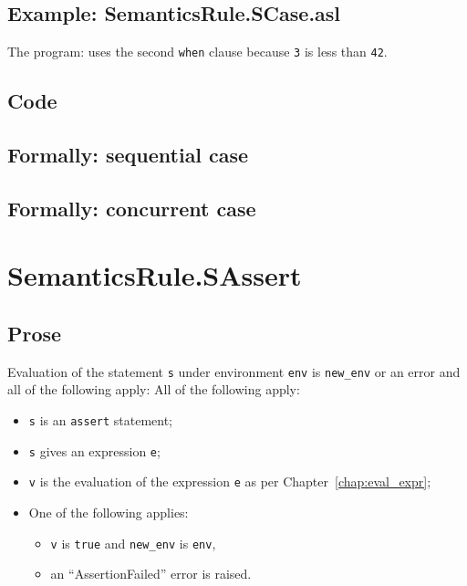 \documentclass{book}
\begin{document}
    \subsection{Example: SemanticsRule.SCase.asl}
    The program:
    uses the second \texttt{when} clause because \texttt{3} is less than \texttt{42}.

  \subsection{Code}

\begin{emptyformal}
  \subsection{Formally: sequential case}

  \subsection{Formally: concurrent case}
\end{emptyformal}


\section{SemanticsRule.SAssert \label{sec:SemanticsRule.SAssert}}

    \subsection{Prose}
  Evaluation of the statement \texttt{s} under environment \texttt{env} is
\texttt{new\_env} or an error and all of the following apply:
    All of the following apply:
    \begin{itemize}
    \item \texttt{s} is an \texttt{assert} statement;
    \item \texttt{s} gives an expression \texttt{e};
    \item \texttt{v} is the evaluation of the expression \texttt{e} as per Chapter~\ref{chap:eval_expr};
    \item One of the following applies:
          \begin{itemize}
          \item \texttt{v} is \texttt{true} and \texttt{new\_env} is \texttt{env},
          \item an ``AssertionFailed'' error is raised.
          \end{itemize}
    \end{itemize}
\end{document}
